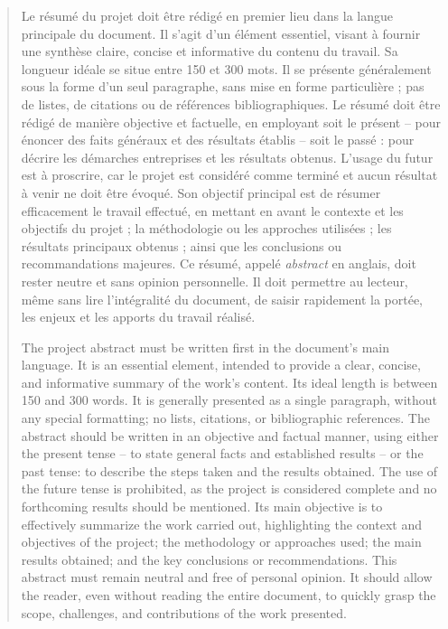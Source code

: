 \begin{abstract}

    Le résumé du projet doit être rédigé en premier lieu dans la langue principale du document. Il s'agit d'un élément essentiel, visant à fournir une synthèse claire, concise et informative du contenu du travail. Sa longueur idéale se situe entre 150 et 300 mots. Il se présente généralement sous la forme d'un seul paragraphe, sans mise en forme particulière ; pas de listes, de citations ou de références bibliographiques. Le résumé doit être rédigé de manière objective et factuelle, en employant soit le présent -- pour énoncer des faits généraux et des résultats établis -- soit le passé : pour décrire les démarches entreprises et les résultats obtenus. L'usage du futur est à proscrire, car le projet est considéré comme terminé et aucun résultat à venir ne doit être évoqué. Son objectif principal est de résumer efficacement le travail effectué, en mettant en avant le contexte et les objectifs du projet ; la méthodologie ou les approches utilisées ; les résultats principaux obtenus ; ainsi que les conclusions ou recommandations majeures. Ce résumé, appelé \emph{abstract} en anglais, doit rester neutre et sans opinion personnelle. Il doit permettre au lecteur, même sans lire l'intégralité du document, de saisir rapidement la portée, les enjeux et les apports du travail réalisé.

    \asterism

    The project abstract must be written first in the document's main language. It is an essential element, intended to provide a clear, concise, and informative summary of the work's content. Its ideal length is between 150 and 300 words. It is generally presented as a single paragraph, without any special formatting; no lists, citations, or bibliographic references. The abstract should be written in an objective and factual manner, using either the present tense -- to state general facts and established results -- or the past tense: to describe the steps taken and the results obtained. The use of the future tense is prohibited, as the project is considered complete and no forthcoming results should be mentioned. Its main objective is to effectively summarize the work carried out, highlighting the context and objectives of the project; the methodology or approaches used; the main results obtained; and the key conclusions or recommendations. This abstract must remain neutral and free of personal opinion. It should allow the reader, even without reading the entire document, to quickly grasp the scope, challenges, and contributions of the work presented.

\end{abstract}
